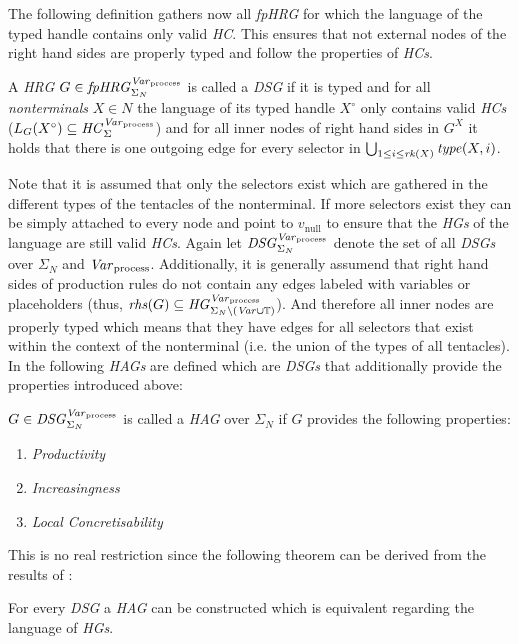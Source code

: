 	The following definition gathers now all \emph{\ac{fpHRG}} for which the
	language of the typed handle contains only valid \emph{\ac{HC}}. This
	ensures that not external nodes of the right hand sides are properly typed
	and follow the properties of \emph{\acp{HC}}.
	\begin{definition}
		A \emph{\ac{HRG}} $G\in\mathit{fpHRG}_{\Sigma_{N}}^{\mathit{Var}_{\text{process}}}$ is called a \emph{\ac{DSG}}
		if it is typed and for all \emph{nonterminals} $X\in N$ the language of
		its typed handle $X^{\circ}$ only contains valid \emph{\aclp{HC}}
		($L_{G}(X^{\circ})\subseteq\mathit{HC}_{\Sigma}^{\mathit{Var}_{\text{process}}}$) and for all inner nodes of right hand
		sides in $G^{X}$ it holds that there is one outgoing edge for every
		selector in $\bigcup_{1\leq i\leq\mathit{rk}(X)}\mathit{type}(X,i)$.
	\end{definition}
	Note that it is assumed that only the selectors exist which are gathered
	in the different types of the tentacles of the nonterminal. If more
	selectors exist they can be simply attached to every node and point to
	$v_{\text{null}}$ to ensure that the \emph{\acp{HG}} of the language are
	still valid \emph{\acp{HC}}. Again let $\mathit{DSG}_{\Sigma_{N}}^{\mathit{Var}_{\text{process}}}$ denote the set of all
	\emph{\acp{DSG}} over $\Sigma_{N}$ and $\mathit{Var}_{\text{process}}$. Additionally, it is generally
	assumend that right hand sides of production rules do not contain any edges
	labeled with variables or placeholders (thus, $\mathit{rhs}(G)\subseteq
	\mathit{HG}^{\mathit{Var}_{\text{process}}}_{\Sigma_{N}\setminus (\mathit{Var}\cup\mathbb{T})}$). And
	therefore all inner nodes are properly typed which means that they have
	edges for all selectors that exist within the context of the nonterminal
	(i.e. the union of the types of all tentacles).
	In the following \emph{\aclp*{HAG}} are defined which are \emph{\acp{DSG}}
	that additionally provide the properties introduced above:
	\begin{definition}
		$G\in\mathit{DSG}_{\Sigma_{N}}^{\mathit{Var}_{\text{process}}}$ is called a \emph{\ac{HAG}} over $\Sigma_{N}$ if $G$ provides
		the following properties:
		\begin{enumerate}
			\item \emph{Productivity}
			\item \emph{Increasingness}
			\item \emph{Local Concretisability}
		\end{enumerate}
	\end{definition}
	This is no real restriction since the following theorem can be derived from
	the results of \cite{LocalGreibachNormalForm}:
	\begin{theorem}
		For every \emph{\ac{DSG}} a \emph{\ac{HAG}} can be constructed which is
		equivalent regarding the language of \emph{\acp{HG}}.
	\end{theorem}

